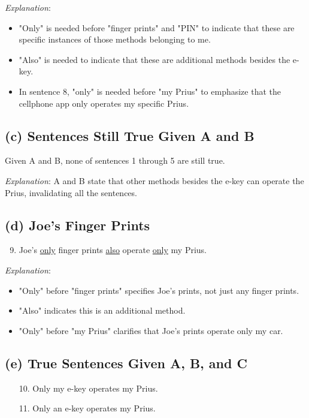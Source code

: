 \documentclass{article}
\begin{document}
\textit{Explanation}:
\begin{itemize}
    \item "Only" is needed before "finger prints" and "PIN" to indicate that these are specific instances of those methods belonging to me.
    \item "Also" is needed to indicate that these are additional methods besides the e-key.
    \item In sentence 8, "only" is needed before "my Prius" to emphasize that the cellphone app only operates my specific Prius.
\end{itemize}

\subsection*{(c) Sentences Still True Given A and B}

Given A and B, none of sentences 1 through 5 are still true.

\textit{Explanation}: A and B state that other methods besides the e-key can operate the Prius, invalidating all the sentences.

\subsection*{(d) Joe's Finger Prints}

\begin{enumerate}[label=(\arabic*)]
    \setcounter{enumi}{8}
    \item Joe's \underline{only} finger prints \underline{also} operate \underline{only} my Prius.
\end{enumerate}

\textit{Explanation}:
\begin{itemize}
    \item "Only" before "finger prints" specifies Joe's prints, not just any finger prints.
    \item "Also" indicates this is an additional method.
    \item "Only" before "my Prius" clarifies that Joe's prints operate only my car.
\end{itemize}

\subsection*{(e) True Sentences Given A, B, and C}

\begin{itemize}
    \item[10.] Only my e-key operates my Prius.
    \item[11.] Only an e-key operates my Prius.
\end{itemize}
\end{document}

